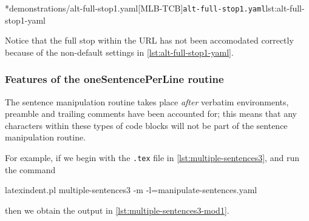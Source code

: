 	\begin{adjustwidth}{-3.5cm}{-1.5cm}
		\begin{minipage}{.6\linewidth}
		\end{minipage}
		\hfill
		\begin{minipage}{.4\linewidth}
			\cmhlistingsfromfile[style=yaml-LST]*{demonstrations/alt-full-stop1.yaml}[MLB-TCB]{\texttt{alt-full-stop1.yaml}}{lst:alt-full-stop1-yaml}
		\end{minipage}
	\end{adjustwidth}

	Notice that the full stop within the URL has not been accomodated correctly because of the non-default settings in \cref{lst:alt-full-stop1-yaml}.

\subsubsection{Features of the oneSentencePerLine routine}
	The sentence manipulation routine takes place \emph{after} verbatim environments, preamble and trailing comments have
	been accounted for; this means that any characters within these types of code blocks will not be part
	of the sentence manipulation routine.

	For example, if we begin with the \texttt{.tex} file in \cref{lst:multiple-sentences3}, and run the command
	\begin{commandshell}
latexindent.pl multiple-sentences3 -m -l=manipulate-sentences.yaml
	\end{commandshell}
	then we obtain the output in \cref{lst:multiple-sentences3-mod1}.

